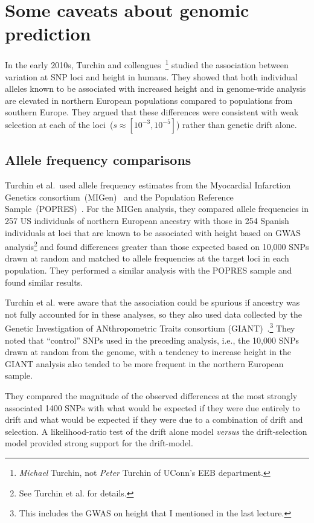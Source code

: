 \documentclass[12pt]{article}
\begin{document}
\section*{Some caveats about genomic prediction}

In the early 2010s, Turchin and
colleagues~\cite{Turchin-etal-2012}\footnote{{\it Michael\/} Turchin,
  not {\it Peter\/} Turchin of UConn's EEB department.} studied the
association between variation at SNP loci and height in humans. They
showed that both individual alleles known to be associated with
increased height and in genome-wide analysis are elevated in northern
European populations compared to populations from southern
Europe. They argued that these differences were consistent with weak
selection at each of the loci~($s \approx [10^{-3}, 10^{-5}]$) rather
than genetic drift alone.

\subsection*{Allele frequency comparisons}

Turchin et al.\ used allele frequency estimates from the Myocardial
Infarction Genetics consortium~(MIGen)~\cite{MIGen-2009} and the
Population Reference Sample~(POPRES)~\cite{Nelson-etal-2008}. For the MIGen
analysis, they compared allele frequencies in 257 US individuals of
northern European ancestry with those in 254 Spanish individuals at
loci that are known to be associated with height based on GWAS
analysis\footnote{See Turchin et al. for details.} and found
differences greater than those expected based on 10,000 SNPs drawn at
random and matched to allele frequencies at the target loci in each
population. They performed a similar analysis with the POPRES sample
and found similar results.

Turchin et al. were aware that the association could be spurious if
ancestry was not fully accounted for in these analyses, so they also
used data collected by the Genetic Investigation of ANthropometric
Traits consortium (GIANT)~\cite{LangoAllen-etal-2010}.\footnote{This
  includes the GWAS on height that I mentioned in the last lecture.}
They noted that ``control'' SNPs used in the preceding analysis,
i.e., the 10,000 SNPs drawn at random from the genome, with a tendency
to increase height in the GIANT analysis also tended to be more
frequent in the northern European sample.

They compared the magnitude of the observed differences at the most
strongly associated 1400 SNPs with what would be expected if they were
due entirely to drift and what would be expected if they were due to a
combination of drift and selection. A likelihood-ratio test of the
drift alone model {\it versus\/} the drift-selection model provided
strong support for the drift-model.
\end{document}
